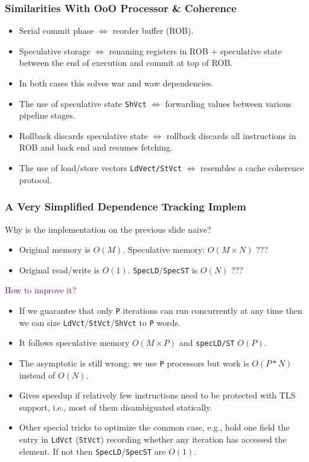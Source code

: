 \documentclass{beamer}
\newcommand{\purple}[1]{\textcolor{Purple}{{#1}}}
\begin{document}
\begin{frame}[fragile,t]
  \frametitle{Similarities With OoO Processor \& Coherence}

\begin{itemize}
\item Serial commit phase $\Leftrightarrow$ reorder buffer (ROB).\medskip
\item Speculative storage $\Leftrightarrow$ renaming registers in ROB +
        speculative state between the end of execution and commit at top of ROB.\medskip
\item In both cases this solves {\sc war} and {\sc waw} dependencies.\medskip
\item The use of speculative state {\tt ShVct} $\Leftrightarrow$ forwarding 
        values between various pipeline stages.\medskip
\item Rollback discards speculative state $\Leftrightarrow$ rollback 
        discards all instructions in ROB and back end and resumes
        fetching.\bigskip

\item The use of load/store vectors {\tt LdVect/StVct} $\Leftrightarrow$
        resembles a cache coherence protocol.
\end{itemize}

\end{frame}

\begin{frame}[fragile,t]
  \frametitle{A Very Simplified Dependence Tracking Implem}

\alert{Why is the implementation on the previous slide naive?}\smallskip\pause

\begin{itemize}
\item Original memory is $O(M)$. Speculative memory: $O(M\times N)$ ???\medskip
\item Original read/write is $O(1)$. {\tt SpecLD}/{\tt SpecST} is $O(N)$ ???
\end{itemize}\bigskip

\purple{How to improve it?}\smallskip\pause
\begin{itemize}
\item If we guarantee that only {\tt P} iterations can run concurrently 
        at any time then we can size {\tt LdVct}/{\tt StVct}/{\tt ShVct} 
        to {\tt P} words.\medskip
\item It follows speculative memory $O(M\times P)$ and {\tt specLD/ST} $O(P)$.\medskip
\item The asymptotic is still wrong: we use {\tt P} processors but work is $O(P*N)$
        instead of $O(N)$.\medskip
\item Gives speedup if relatively few instructions need to be protected
        with TLS support, i.e., most of them disambiguated statically.\medskip
\item Other special tricks to optimize the common case, e.g., hold one field
        the entry in {\tt LdVct} ({\tt StVct}) recording whether any iteration
        has accessed the element. If not then {\tt SpecLD}/{\tt SpecST} are $O(1)$.
\end{itemize} 

\end{frame}
\end{document}
